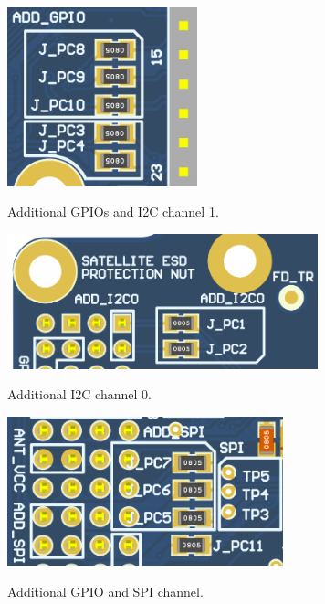 \begin{figure}[!ht]
    \begin{center}
         \includegraphics[width=55mm]{figures/add_gpio_i2c1_jumpers.png}
        \caption{Additional GPIOs and I2C channel 1.}
        \label{fig:add_gpio_i2c1_jumpers}
        \includegraphics[width=90mm]{figures/add_i2c0_jumpers.png}
        \caption{Additional I2C channel 0.}
        \label{fig:add_i2c0_jumpers}
        \includegraphics[width=80mm]{figures/add_spi_1gpio_jumpers.png}
        \caption{Additional GPIO and SPI channel.}
        \label{fig:add_spi_1gpio_jumpers}
    \end{center}
\end{figure}